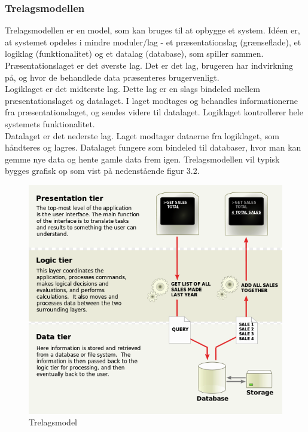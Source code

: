 \subsubsection{Trelagsmodellen}
Trelagsmodellen er en model, som kan bruges til at opbygge et system. Idéen er, at systemet opdeles i mindre moduler/lag - et præsentationslag (grænseflade), et logiklag (funktionalitet) og et datalag (database), som spiller sammen. \\
Præsentationslaget er det øverste lag. Det er det lag, brugeren har indvirkning på, og hvor de behandlede data præsenteres brugervenligt. \\
Logiklaget er det midterste lag. Dette lag er en slags bindeled mellem præsentationslaget og datalaget. I laget modtages og behandles informationerne fra præsentationslaget, og sendes videre til datalaget. Logiklaget kontrollerer hele systemets funktionalitet.\\
Datalaget er det nederste lag. Laget modtager dataerne fra logiklaget, som håndteres og lagres. Datalaget fungere som bindeled til databaser, hvor man kan gemme nye data og hente gamle data frem igen. Trelagsmodellen vil typisk bygges grafisk op som vist på nedenstående figur 3.2.\\

\begin{figure}[H]
	\centering
	\includegraphics[width=1\textwidth]{Figurer/Snip20150415_39}
	\caption{Trelagsmodel\protect\footnotemark}
\end{figure}

